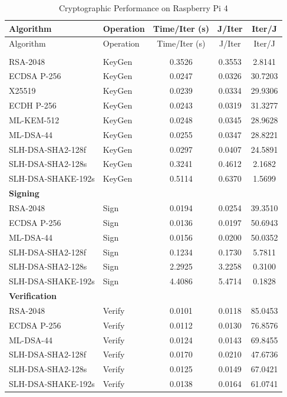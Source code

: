 \documentclass[11pt, letterpaper]{article}
\begin{document}
\begin{longtable}{llccc}
\caption{Cryptographic Performance on Raspberry Pi 4} \\
\hline
Algorithm & Operation & Time/Iter (s) & J/Iter & Iter/J \\
\hline
\endfirsthead

\hline
Algorithm & Operation & Time/Iter (s) & J/Iter & Iter/J \\
\hline
\endhead

\hline
\endfoot

\hline
\endlastfoot

\multicolumn{5}{l}{\textbf{Key Generation}} \\

RSA-2048 & KeyGen & 0.3526 & 0.3553 & 2.8141 \\
ECDSA P-256 & KeyGen & 0.0247 & 0.0326 & 30.7203 \\
X25519 & KeyGen & 0.0239 & 0.0334 & 29.9306 \\
ECDH P-256 & KeyGen & 0.0243 & 0.0319 & 31.3277 \\
ML-KEM-512 & KeyGen & 0.0248 & 0.0345 & 28.9628 \\
ML-DSA-44 & KeyGen & 0.0255 & 0.0347 & 28.8221 \\
SLH-DSA-SHA2-128f & KeyGen & 0.0297 & 0.0407 & 24.5891 \\
SLH-DSA-SHA2-128s & KeyGen & 0.3241 & 0.4612 & 2.1682 \\
SLH-DSA-SHAKE-192s & KeyGen & 0.5114 & 0.6370 & 1.5699 \\

\multicolumn{5}{l}{\textbf{Signing}} \\

RSA-2048 & Sign & 0.0194 & 0.0254 & 39.3510 \\
ECDSA P-256 & Sign & 0.0136 & 0.0197 & 50.6943 \\
ML-DSA-44 & Sign & 0.0156 & 0.0200 & 50.0352 \\
SLH-DSA-SHA2-128f & Sign & 0.1234 & 0.1730 & 5.7811 \\
SLH-DSA-SHA2-128s & Sign & 2.2925 & 3.2258 & 0.3100 \\
SLH-DSA-SHAKE-192s & Sign & 4.4086 & 5.4714 & 0.1828 \\

\multicolumn{5}{l}{\textbf{Verification}} \\

RSA-2048 & Verify & 0.0101 & 0.0118 & 85.0453 \\
ECDSA P-256 & Verify & 0.0112 & 0.0130 & 76.8576 \\
ML-DSA-44 & Verify & 0.0124 & 0.0143 & 69.8455 \\
SLH-DSA-SHA2-128f & Verify & 0.0170 & 0.0210 & 47.6736 \\
SLH-DSA-SHA2-128s & Verify & 0.0125 & 0.0149 & 67.0421 \\
SLH-DSA-SHAKE-192s & Verify & 0.0138 & 0.0164 & 61.0741 \\

\end{longtable}
\end{document}

